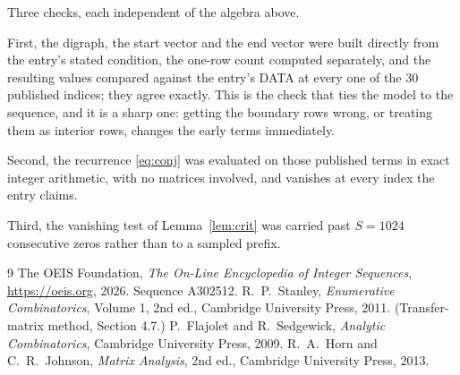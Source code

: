 \documentclass[11pt,a4paper]{article}
\theoremstyle{plain}
\theoremstyle{definition}
\begin{document}
Three checks, each independent of the algebra above.

First, the digraph, the start vector and the end vector were built directly from the
entry's stated condition, the one-row count computed separately, and the resulting values
compared against the entry's DATA at every one of the $30$ published indices; they
agree exactly. This is the check that ties the model to the sequence, and it is a sharp one:
getting the boundary rows wrong, or treating them as interior rows, changes the early terms
immediately.

Second, the recurrence \eqref{eq:conj} was evaluated on those published terms in exact
integer arithmetic, with no matrices involved, and vanishes at every index the entry claims.

Third, the vanishing test of Lemma~\ref{lem:crit} was carried past $S=1024$ consecutive
zeros rather than to a sampled prefix.

\begin{thebibliography}{9}
 The OEIS Foundation, \emph{The On-Line Encyclopedia of Integer
Sequences}, \url{https://oeis.org}, 2026. Sequence A302512.
 R.~P.~Stanley, \emph{Enumerative Combinatorics}, Volume 1, 2nd ed.,
Cambridge University Press, 2011. (Transfer-matrix method, Section 4.7.)
 P.~Flajolet and R.~Sedgewick, \emph{Analytic Combinatorics}, Cambridge
University Press, 2009.
 R.~A.~Horn and C.~R.~Johnson, \emph{Matrix Analysis}, 2nd ed., Cambridge
University Press, 2013.
\end{thebibliography}
\end{document}
